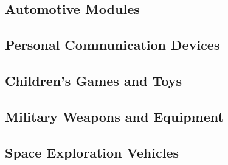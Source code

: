 \subsection{Automotive Modules}
\label{cint0:sexa0:samd0}


\subsection{Personal Communication Devices}
\label{cint0:sexa0:spcd0}


\subsection{Children's Games and Toys}
\label{cint0:sexa0:scty0}


\subsection{Military Weapons and Equipment}
\label{cint0:sexa0:scty0}


\subsection{Space Exploration Vehicles}
\label{cint0:sexa0:scty0}


